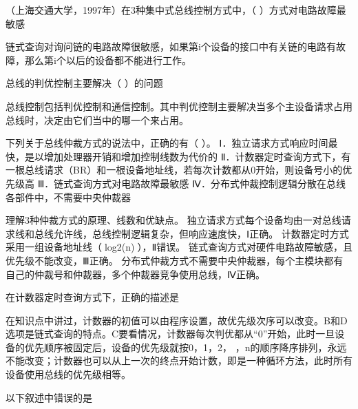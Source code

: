 \question （上海交通大学，1997年）在3种集中式总线控制方式中，（
）方式对电路故障最敏感
\par{}
\begin{solution}链式查询对询问链的电路故障很敏感，如果第i个设备的接口中有关链的电路有故障，那么第i个以后的设备都不能进行工作。
\end{solution}
\question 总线的判优控制主要解决（ ）的问题
\par{}
\begin{solution}总线控制包括判优控制和通信控制。其中判优控制主要解决当多个主设备请求占用总线时，决定由它们当中的哪一个来占用。
\end{solution}
\question 下列关于总线仲裁方式的说法中，正确的有（ ）。
Ⅰ．独立请求方式响应时间最快，是以增加处理器开销和增加控制线数为代价的
Ⅱ．计数器定时查询方式下，有一根总线请求（BR）和一根设备地址线，若每次计数都从0开始，则设备号小的优先级高
Ⅲ．链式查询方式对电路故障最敏感
Ⅳ．分布式仲裁控制逻辑分散在总线各部件中，不需要中央仲裁器
\par{}
\begin{solution}理解3种仲裁方式的原理、线数和优缺点。
独立请求方式每个设备均由一对总线请求线和总线允许线，总线控制逻辑复杂，但响应速度快，Ⅰ正确。
计数器定时方式采用一组设备地址线（log2(n)），Ⅱ错误。
链式查询方式对硬件电路故障敏感，且优先级不能改变，Ⅲ正确。
分布式仲裁方式不需要中央仲裁器，每个主模块都有自己的仲裁号和仲裁器，多个仲裁器竞争使用总线，Ⅳ正确。
\end{solution}
\question 在计数器定时查询方式下，正确的描述是
\par{}
\begin{solution}在知识点中讲过，计数器的初值可以由程序设置，故优先级次序可以改变。B和D选项是链式查询的特点。C要看情况，计数器每次判优都从``0''开始，此时一旦设备的优先顺序被固定后，设备的优先级就按0，1，2，
，n的顺序降序排列，永远不能改变；计数器也可以从上一次的终点开始计数，即是一种循环方法，此时所有设备使用总线的优先级相等。
\end{solution}
\question 以下叙述中错误的是
\par{}
